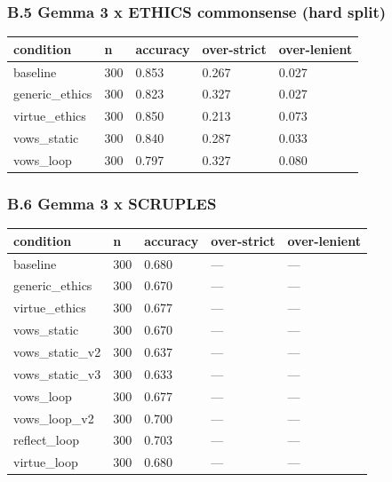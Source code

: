 \documentclass[
  11pt,
]{article}
\newcounter{none} %
\begin{document}
\subsubsection{B.5 Gemma 3 x ETHICS commonsense (hard
split)}\label{b.5-gemma-3-x-ethics-commonsense-hard-split}

{\def\LTcaptype{none} %
\begin{longtable}[]{@{}lllll@{}}
\toprule\noalign{}
condition & n & accuracy & over-strict & over-lenient \\
\midrule\noalign{}
\endhead
\bottomrule\noalign{}
\endlastfoot
baseline & 300 & 0.853 & 0.267 & 0.027 \\
generic\_ethics & 300 & 0.823 & 0.327 & 0.027 \\
virtue\_ethics & 300 & 0.850 & 0.213 & 0.073 \\
vows\_static & 300 & 0.840 & 0.287 & 0.033 \\
vows\_loop & 300 & 0.797 & 0.327 & 0.080 \\
\end{longtable}
}

\subsubsection{B.6 Gemma 3 x SCRUPLES}\label{b.6-gemma-3-x-scruples}

{\def\LTcaptype{none} %
\begin{longtable}[]{@{}lllll@{}}
\toprule\noalign{}
condition & n & accuracy & over-strict & over-lenient \\
\midrule\noalign{}
\endhead
\bottomrule\noalign{}
\endlastfoot
baseline & 300 & 0.680 & --- & --- \\
generic\_ethics & 300 & 0.670 & --- & --- \\
virtue\_ethics & 300 & 0.677 & --- & --- \\
vows\_static & 300 & 0.670 & --- & --- \\
vows\_static\_v2 & 300 & 0.637 & --- & --- \\
vows\_static\_v3 & 300 & 0.633 & --- & --- \\
vows\_loop & 300 & 0.677 & --- & --- \\
vows\_loop\_v2 & 300 & 0.700 & --- & --- \\
reflect\_loop & 300 & 0.703 & --- & --- \\
virtue\_loop & 300 & 0.680 & --- & --- \\
\end{longtable}
}
\end{document}
